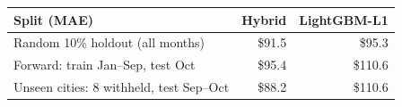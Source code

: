 \begin{tabular}{@{}lrr@{}}
\toprule
\textbf{Split (MAE)} & \textbf{Hybrid} & \textbf{LightGBM-L1} \\
\midrule
Random 10\% holdout (all months) & \$91.5 & \$95.3 \\
Forward: train Jan--Sep, test Oct & \$95.4 & \$110.6 \\
Unseen cities: 8 withheld, test Sep--Oct & \$88.2 & \$110.6 \\
\bottomrule
\end{tabular}
